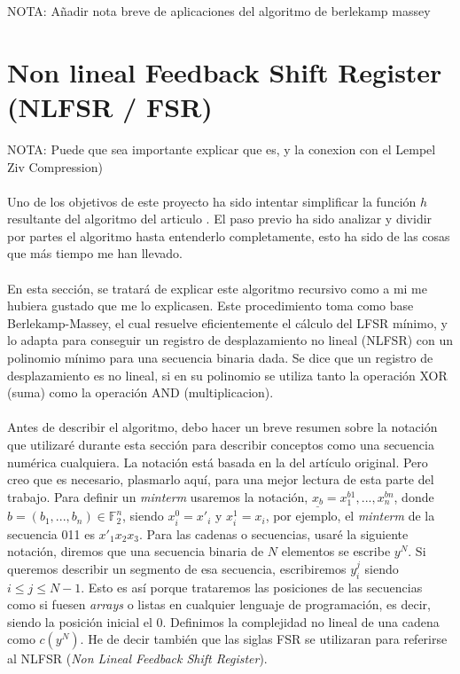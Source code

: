 NOTA: Añadir nota breve de aplicaciones del algoritmo de berlekamp massey

\newpage
\section{Non lineal Feedback Shift Register (NLFSR / FSR)}
NOTA: Puede que sea importante explicar que es, y la conexion con el Lempel Ziv Compression)\\\\
Uno de los objetivos de este proyecto ha sido intentar simplificar la función $h$ resultante del algoritmo del articulo \cite{limniotis2007nonlinear}. El paso previo ha sido analizar y dividir por partes el algoritmo hasta entenderlo completamente, esto ha sido de las cosas que más tiempo me han llevado. \\\\
En esta sección, se tratará de explicar este algoritmo recursivo como a mi me hubiera gustado que me lo explicasen. Este procedimiento toma como base Berlekamp-Massey, el cual resuelve eficientemente el cálculo del LFSR mínimo, y lo adapta para conseguir un registro de desplazamiento no lineal (NLFSR) con un 
polinomio mínimo para una secuencia binaria dada. Se dice que un registro de desplazamiento es no lineal, si en su polinomio se utiliza tanto la operación XOR (suma) como la operación AND (multiplicacion).\\\\
Antes de describir el algoritmo, debo hacer un breve resumen sobre la notación que utilizaré durante esta sección para describir conceptos como una secuencia numérica cualquiera. La notación está basada en la del artículo original. Pero creo que es necesario, plasmarlo aquí, para una mejor lectura de esta parte del trabajo. Para definir un \textit{minterm} usaremos la notación, $\underline{x_b} = x_1^{b1} ,..., x_n^{bn}$, donde $b = (b_1,...,b_n) \in \mathbb{F}_2^{n}$, siendo $x_i^0 = x'_i$ y $x_i^1 = x_i$, por ejemplo, el \textit{minterm} de la secuencia 011 es $x'_1x_2x_3$. Para las cadenas o secuencias, usaré la siguiente notación, diremos que una secuencia binaria de $N$ elementos se escribe $y^{N}$. Si queremos describir un segmento de esa secuencia, escribiremos $y_{i}^{j}$ siendo $i\leq j \leq N-1$. Esto es así porque trataremos las posiciones de las secuencias como si fuesen \textit{arrays} o listas en cualquier lenguaje de programación, es decir, siendo la posición inicial el 0. Definimos la complejidad no lineal de una cadena como $c(y^{N})$. He de decir también que las siglas FSR se utilizaran para referirse al NLFSR (\textit{Non Lineal Feedback Shift Register}). \\\\%
